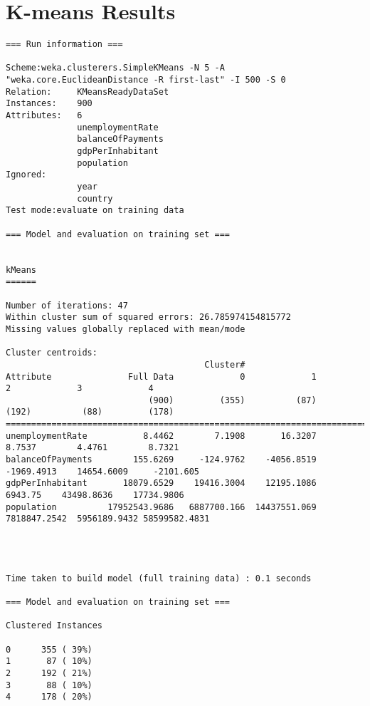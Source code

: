 \section{K-means Results}

\begin{lstlisting}[basicstyle=\footnotesize\ttfamily,numbers=none]
=== Run information ===

Scheme:weka.clusterers.SimpleKMeans -N 5 -A "weka.core.EuclideanDistance -R first-last" -I 500 -S 0
Relation:     KMeansReadyDataSet
Instances:    900
Attributes:   6
              unemploymentRate
              balanceOfPayments
              gdpPerInhabitant
              population
Ignored:
              year
              country
Test mode:evaluate on training data

=== Model and evaluation on training set ===


kMeans
======

Number of iterations: 47
Within cluster sum of squared errors: 26.785974154815772
Missing values globally replaced with mean/mode

Cluster centroids:
                                       Cluster#
Attribute               Full Data             0             1             2             3             4
                            (900)         (355)          (87)         (192)          (88)         (178)
=======================================================================================================
unemploymentRate           8.4462        7.1908       16.3207        8.7537        4.4761        8.7321
balanceOfPayments        155.6269     -124.9762    -4056.8519    -1969.4913    14654.6009     -2101.605
gdpPerInhabitant       18079.6529    19416.3004    12195.1086       6943.75    43498.8636    17734.9806
population          17952543.9686   6887700.166  14437551.069  7818847.2542  5956189.9432 58599582.4831




Time taken to build model (full training data) : 0.1 seconds

=== Model and evaluation on training set ===

Clustered Instances

0      355 ( 39%)
1       87 ( 10%)
2      192 ( 21%)
3       88 ( 10%)
4      178 ( 20%)


\end{lstlisting}
